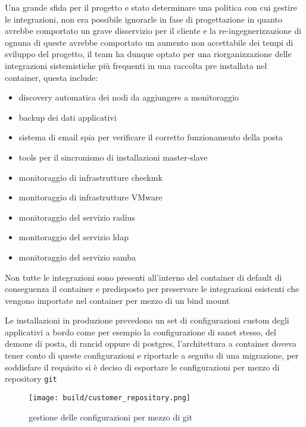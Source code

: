 Una grande sfida per il progetto e stato determinare una politica con cui gestire le integrazioni, non era possibile ignorarle in fase di progettazione in quanto avrebbe comportato un grave disservizio per il cliente e la re-ingegnerizzazione di ognuna di queste avrebbe comportato un aumento non accettabile dei tempi di sviluppo del progetto, il team ha dunque optato per una riorganizzazione delle integrazioni sistemistiche più frequenti in una raccolta pre installata nel container, questa include:

\begin{itemize}
  \item{discovery automatica dei nodi da aggiungere a monitoraggio}
  \item{backup dei dati applicativi}
  \item{sistema di email spia per verificare il corretto funzionamento della posta}
  \item{tools per il sincronismo di installazioni master-slave}
  \item{monitoraggio di infrastrutture checkmk}
  \item{monitoraggio di infrastrutture VMware}
  \item{monitoraggio del servizio radius }
  \item{monitoraggio del servizio ldap }
  \item{monitoraggio del servizio samba }
\end{itemize}

Non tutte le integrazioni sono presenti all'interno del container di default di conseguenza il container e predisposto per preservare le integrazioni esistenti che vengono importate nel container per mezzo di un bind mount

Le installazioni in produzione prevedono un set di configurazioni custom degli applicativi a bordo come per esempio la configurazione di sanet stesso, del demone di posta, di rancid oppure di postgres, l'architettura a container doveva tener conto di queste configurazioni e riportarle a seguito di una migrazione, per soddisfare il requisito si è deciso di esportare le configurazioni per mezzo di repository \verb|git|

\begin{figure}[H]
    \centering
    \texttt{[image: build/customer\_repository.png]}
    \caption{gestione delle configurazioni per mezzo di git}
    \label{fig:enter-label}
\end{figure}

